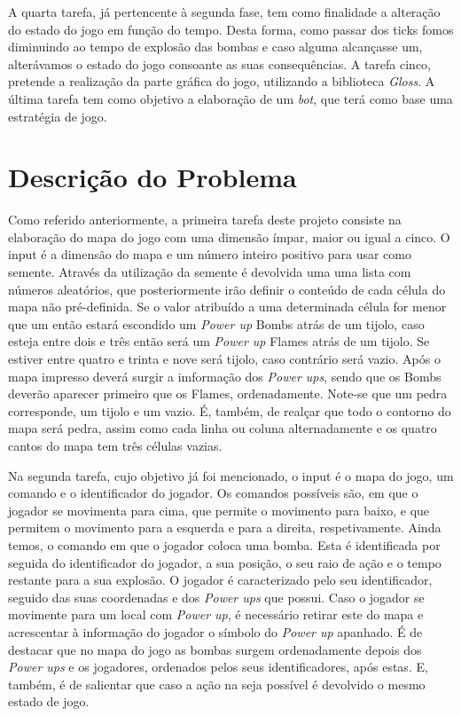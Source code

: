 \documentclass[a4paper]{article}
\begin{document}
A quarta tarefa, já pertencente à segunda fase, tem como finalidade a alteração do estado do jogo em função do tempo. Desta forma, como passar dos ticks fomos diminuindo ao tempo de explosão das bombas e caso alguma alcançasse um, alterávamos o estado do jogo consoante as suas consequências. A tarefa cinco, pretende a realização da parte gráfica do jogo, utilizando a biblioteca \textit{Gloss}. A última tarefa tem como objetivo a elaboração de um \textit{bot}, que terá como base uma estratégia de jogo.   


\cleardoublepage
\section{Descrição do Problema}
\label{sec:problema}

Como referido anteriormente, a primeira tarefa deste projeto consiste na elaboração do mapa do jogo com uma dimensão ímpar, maior ou igual a cinco. O input é a dimensão do mapa e um número inteiro positivo para usar como semente. Através da utilização da semente é devolvida uma uma lista com números aleatórios, que posteriormente irão definir o conteúdo de cada célula do mapa não pré-definida. Se o valor atribuído a uma determinada célula for menor que um então estará escondido um \textit{Power up} Bombs atrás de um tijolo, caso esteja entre dois e três então será um \textit{Power up} Flames atrás de um tijolo. Se estiver entre quatro e trinta e nove será tijolo, caso contrário será vazio. Após o mapa impresso deverá surgir a imformação dos \textit{Power ups}, sendo que os Bombs deverão aparecer primeiro que os Flames, ordenadamente. Note-se que um pedra corresponde, um tijolo e um vazio. É, também, de realçar que todo o contorno do mapa será pedra, assim como cada linha ou coluna alternadamente e os quatro cantos do mapa tem três células vazias.

Na segunda tarefa, cujo objetivo já foi mencionado, o input é o mapa do jogo, um comando e o identificador do jogador. Os comandos possíveis são, em que o jogador se movimenta para cima, que permite o movimento para baixo, e que permitem o movimento para a esquerda e para a direita, respetivamente. Ainda temos, o comando em que o jogador coloca uma bomba. Esta é identificada por seguida do identificador do jogador, a sua posição, o seu raio de ação e o tempo restante para a sua explosão. O jogador é caracterizado pelo seu identificador, seguido das suas coordenadas e dos \textit{Power ups} que possui. Caso o jogador se movimente para um local com \textit{Power up}, é necessário retirar este do mapa e acrescentar à informação do jogador o símbolo do \textit{Power up} apanhado. É de destacar que no mapa do jogo as bombas surgem ordenadamente depois dos \textit{Power ups} e os jogadores, ordenados pelos seus identificadores, após estas. E, também, é de salientar que caso a ação na seja possível é devolvido o mesmo estado de jogo.
\end{document}
